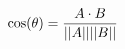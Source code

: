 \documentclass[preview]{standalone}
\begin{document}
\begin{align*}
\special{dvisvgm:raw <g id='unique000'>}\cos(\theta)=\frac{A\cdot B}{||A||||B||}\special{dvisvgm:raw </g>}
\end{align*}
\end{document}
